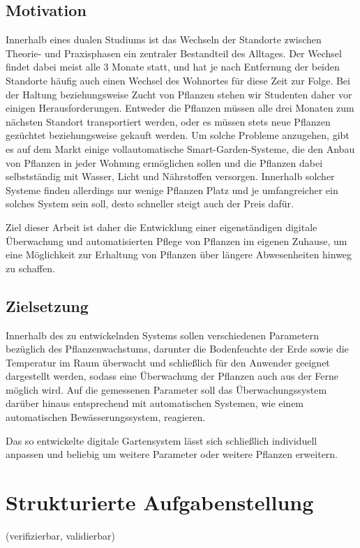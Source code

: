 \documentclass[
    load-dhbw-templates,
    load-preamble = true,
    auto-intro-pages = all,
    add-tocs-to-toc,
    debug = true,
    language = english,
    mainlanguage = ngerman,
    add-bibliography,
    bib-file = dhbw-source.bib,
    biblatex/style = numeric,
    print- = false
]{iodhbwm}
\begin{document}
    \section{Motivation}
    Innerhalb eines dualen Studiums ist das Wechseln der Standorte zwischen Theorie- und Praxisphasen ein zentraler Bestandteil des Alltages. Der Wechsel findet dabei meist alle 3 Monate statt, und hat je nach Entfernung der beiden Standorte häufig auch einen Wechsel des Wohnortes für diese Zeit zur Folge. Bei der Haltung beziehungsweise Zucht von Pflanzen stehen wir Studenten daher vor einigen Herausforderungen.
    Entweder die Pflanzen müssen alle drei Monaten zum nächsten Standort transportiert werden, oder es müssen stets neue Pflanzen gezüchtet beziehungsweise gekauft werden. Um solche Probleme anzugehen, gibt es auf dem Markt einige vollautomatische Smart-Garden-Systeme, die den Anbau von Pflanzen in jeder Wohnung ermöglichen sollen und die Pflanzen dabei selbstständig mit Wasser, Licht und Nährstoffen versorgen. Innerhalb solcher Systeme finden allerdings nur wenige Pflanzen Platz und je umfangreicher ein solches System sein soll, desto schneller steigt auch der Preis dafür.

    Ziel dieser Arbeit ist daher die Entwicklung einer eigenständigen digitale Überwachung und automatisierten Pflege von Pflanzen im eigenen Zuhause, um eine Möglichkeit zur Erhaltung von Pflanzen über längere Abwesenheiten hinweg zu schaffen.

    \section{Zielsetzung}
    Innerhalb des zu entwickelnden Systems sollen verschiedenen Parametern bezüglich des Pflanzenwachstums, darunter die Bodenfeuchte der Erde sowie die Temperatur im Raum überwacht und schließlich für den Anwender geeignet dargestellt werden, sodass eine Überwachung der Pflanzen auch aus der Ferne möglich wird.  
    Auf die gemessenen Parameter soll das Überwachungssystem darüber hinaus entsprechend mit automatischen Systemen, wie einem automatischen Bewässerungssystem, reagieren.

    Das so entwickelte digitale Gartensystem lässt sich schließlich individuell anpassen und beliebig um weitere Parameter oder weitere Pflanzen erweitern.

\chapter{Strukturierte Aufgabenstellung} 
    (verifizierbar, validierbar)
\end{document}
